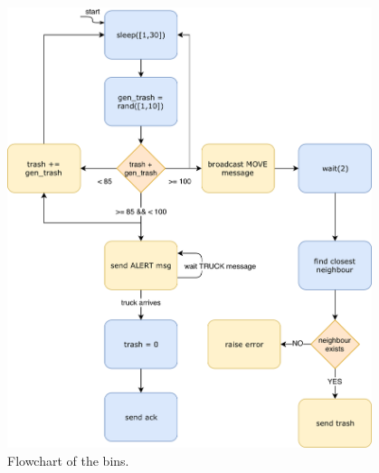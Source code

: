 \documentclass[a4paper, 11pt, parskip=half]{scrartcl}
\begin{document}
\begin{figure}[H]
    \begin{minipage}[t]{0.5\textwidth}
        \centering
        \includegraphics[width=0.95\textwidth]{resources/bin_flow_chart}
        \caption{Flowchart  of the bins.}
        \label{fig:bin-flow}
    \end{minipage}
    \hspace*{\fill}
    \begin{minipage}[t]{0.5\textwidth}
        \centering

\end{minipage}
\end{figure}
\end{document}
